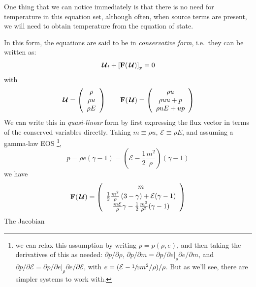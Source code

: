 One thing that we can notice immediately is that there is no need for
temperature in this equation set, although often, when source terms
are present, we will need to obtain temperature from the equation of
state.

In this form, the equations are said to be in {\em conservative form},
i.e.\ they can be written as:
\begin{equation}
{\,\boldsymbol{\mathcal{U}}}_t + \left [{\bf F}({\,\boldsymbol{\mathcal{U}}}) \right ]_x = 0
\end{equation}
with
\begin{equation}
\Uc = \left ( \begin{array}{c} \rho \\ \rho u \\ \rho E \end{array} \right )
%
\qquad
%
\Fb(\Uc) = \left ( \begin{array}{c} \rho u \\ \rho uu + p \\ \rho u E + up \end{array} \right )
\end{equation}
%
We can write this in {\em quasi-linear} form by first expressing the
flux vector in terms of the conserved variables directly.  Taking $m
\equiv \rho u$, $\mathcal{E} \equiv \rho E$, and assuming a gamma-law
EOS%
\footnote{we can relax this assumption by writing $p = p(\rho, e)$, and then
taking the derivatives of this as needed:  $\partial p/\partial \rho$, 
$\partial p/\partial m = \partial p /\partial e|_\rho \partial e/\partial m$,
and $\partial p/\partial \mathcal{E} = \partial p/\partial e|_\rho \partial e/\partial \mathcal{E}$,
with $e = (\mathcal{E} - {\sfrac{1}{2}} m^2/\rho)/\rho$.  But as we'll see, there are
simpler systems to work with.},
\begin{equation}
p = \rho e (\gamma-1) =  \left (\mathcal{E} - \frac{1}{2} \frac{m^2}{\rho}\right )(\gamma - 1)
\end{equation}
we have
\begin{equation}
{\bf F}({\,\boldsymbol{\mathcal{U}}}) = \left ( \begin{array}{c}
      m \\
      \frac{1}{2}\frac{m^2}{\rho} \left (3 - \gamma \right ) +
          \mathcal{E} (\gamma - 1) \\
      \frac{m\mathcal{E}}{\rho} \gamma -\frac{1}{2} \frac{m^3}{\rho^2} (\gamma -1) \end{array} \right )
\end{equation}
The Jacobian%
